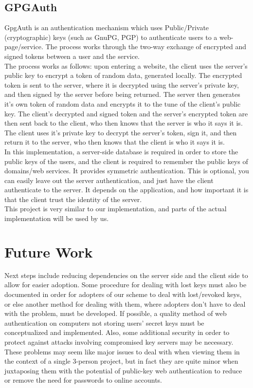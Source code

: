 \documentclass[11pt]{article}
\begin{document}
\subsection{GPGAuth} \label{subsec:gpgauth}
GpgAuth\cite{gpgauth} is an authentication mechanism which uses Public/Private (cryptographic) keys (such as GnuPG, PGP) to authenticate users to a web-page/service.  The process works through the two-way exchange of encrypted and signed tokens between a user and the service.\\
	The process works as follows: upon entering a website, the client uses the server's public key to encrypt a token of random data, generated locally.  The encrypted token is sent to the server, where it is decrypted using the server's private key, and then signed by the server before being returned.  The server then generates it's own token of random data and encrypts it to the tune of the client's public key.  The client's decrypted and signed token  and the server's encrypted token are then sent back to the client, who then knows that the server is who it says it is.  The client uses it's private key to decrypt the server's token, sign it, and then return it to the server, who then knows that the client is who it says it is.\\
	In this implementation, a server-side database is required in order to store the public keys of the users, and the client is required to remember the public keys of domains/web services. It provides symmetric authentication. This is optional, you can easily leave out the server authentication, and just have the client authenticate to the server. It depends on the application, and how important it is that the client trust the identity of the server.\\
	This project is very similar to our implementation, and parts of the actual implementation will be used by us.

\section{Future Work} \label{sec:futureWork}
Next steps include reducing dependencies on the server side and the client side to allow for easier adoption.  Some procedure for dealing with lost keys must also be documented in order for adopters of our scheme to deal with lost/revoked keys, or else another method for dealing with them, where adopters don't have to deal with the problem, must be developed.  If possible, a quality method of web authentication on computers not storing users' secret keys must be conceptualized and implemented.  Also, some additional security in order to protect against attacks involving compromised key servers may be necessary.  These problems may seem like major issues to deal with when viewing them in the context of a single 3-person project, but in fact they are quite minor when juxtaposing them with the potential of public-key web authentication to reduce or remove the need for passwords to online accounts.

\pagebreak

{}
\end{document}
